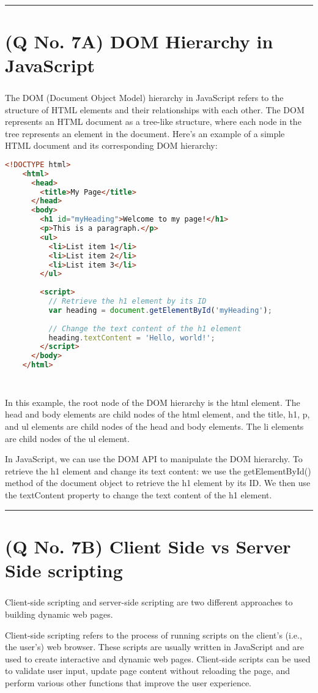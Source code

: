 \documentclass[11pt]{article}
\begin{document}
\noindent\rule{\linewidth}{0.4pt}
\section{(Q No. 7A) DOM Hierarchy in JavaScript}
\subparagraph{}
The DOM (Document Object Model) hierarchy in JavaScript refers to the structure of HTML elements and their relationships with each other. The DOM represents an HTML document as a tree-like structure, where each node in the tree represents an element in the document. Here's an example of a simple HTML document and its corresponding DOM hierarchy:
\begin{lstlisting}[language=html]
    <!DOCTYPE html>
    <html>
      <head>
        <title>My Page</title>
      </head>
      <body>
        <h1 id="myHeading">Welcome to my page!</h1>
        <p>This is a paragraph.</p>
        <ul>
          <li>List item 1</li>
          <li>List item 2</li>
          <li>List item 3</li>
        </ul>
        
        <script>
          // Retrieve the h1 element by its ID
          var heading = document.getElementById('myHeading');
          
          // Change the text content of the h1 element
          heading.textContent = 'Hello, world!';
        </script>
      </body>
    </html>
    
    
\end{lstlisting}
In this example, the root node of the DOM hierarchy is the html element. The head and body elements are child nodes of the html element, and the title, h1, p, and ul elements are child nodes of the head and body elements. The li elements are child nodes of the ul element.

In JavaScript, we can use the DOM API to manipulate the DOM hierarchy. To retrieve the h1 element and change its text content:
we use the getElementById() method of the document object to retrieve the h1 element by its ID. We then use the textContent property to change the text content of the h1 element.


\noindent\rule{\linewidth}{0.4pt}
\section{(Q No. 7B) Client Side vs Server Side scripting}
\subparagraph{}

Client-side scripting and server-side scripting are two different approaches to building dynamic web pages.

Client-side scripting refers to the process of running scripts on the client's (i.e., the user's) web browser. These scripts are usually written in JavaScript and are used to create interactive and dynamic web pages. Client-side scripts can be used to validate user input, update page content without reloading the page, and perform various other functions that improve the user experience.
\end{document}
